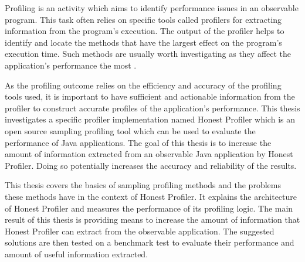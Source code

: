\documentclass[..thesis.tex]{subfiles}
\begin{document}
Profiling is an activity which aims to identify performance issues in an observable program. This task often relies on specific tools called profilers for extracting information from the program's execution. The output of the profiler helps to identify and locate the methods that have the largest effect on the program's execution time. Such methods are usually worth investigating as they affect the application's performance the most \cite{mytkowicz_evaluating_2010}.

As the profiling outcome relies on the efficiency and accuracy of the profiling tools used,   it is important to have sufficient and actionable information from the profiler to construct accurate profiles of the application's performance. This thesis investigates a specific profiler implementation named Honest Profiler which is an open source sampling profiling tool which can be used to evaluate the performance of Java applications. The goal of this thesis is to increase the amount of information extracted from an observable Java application by Honest Profiler. Doing so potentially increases the accuracy and reliability of the results.  

This thesis covers the basics of sampling profiling methods and the problems these methods have in the context of Honest Profiler. It explains the architecture of Honest Profiler and measures the performance of its profiling logic. The main result of this thesis is providing means to increase the amount of information that Honest Profiler can extract from the observable application. The suggested solutions are then tested on a benchmark test to evaluate their performance and amount of useful information extracted.

\end{document}
